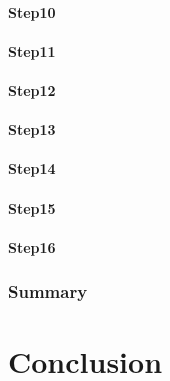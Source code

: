 \documentclass[a4paper, 11pt]{scrartcl}
\begin{document}
\paragraph{Step10}
\paragraph{Step11}
\paragraph{Step12}
\paragraph{Step13}
\paragraph{Step14}
\paragraph{Step15}
\paragraph{Step16}
\subsubsection{Summary}


\section{Conclusion}



\clearpage
\printbibliography[heading=bibintoc]
\end{document}

